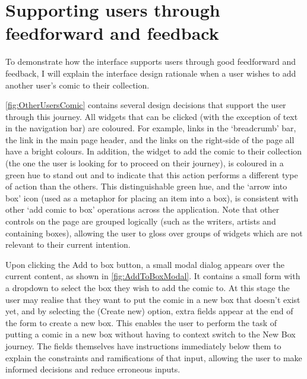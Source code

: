 \documentclass[fontsize=12pt,a4paper]{scrreprt}
\begin{document}

\newpage
\section{Supporting users through feedforward and feedback}


To demonstrate how the interface supports users through good feedforward and feedback, I will explain the interface design rationale when a user wishes to add another user's comic to their collection.

\autoref{fig:OtherUsersComic} contains several design decisions that support the user through this journey. All widgets that can be clicked (with the exception of text in the navigation bar) are coloured. For example, links in the `breadcrumb' bar, the link in the main page header, and the links on the right-side of the page all have a bright colours. In addition, the widget to add the comic to their collection (the one the user is looking for to proceed on their journey), is coloured in a green hue to stand out and to indicate that this action performs a different type of action than the others. This distinguishable green hue, and the `arrow into box' icon (used as a metaphor for placing an item into a box), is consistent with other `add comic to box' operations across the application. Note that other controls on the page are grouped logically (such as the writers, artists and containing boxes), allowing the user to gloss over groups of widgets which are not relevant to their current intention.

Upon clicking the \textsf{Add to box} button, a small modal dialog appears over the current content, as shown in \autoref{fig:AddToBoxModal}. It contains a small form with a dropdown to select the box they wish to add the comic to. At this stage the user may realise that they want to put the comic in a new box that doesn't exist yet, and by selecting the \textsf{(Create new)} option, extra fields appear at the end of the form to create a new box. This enables the user to perform the task of putting a comic in a new box without having to context switch to the \textsf{New Box} journey. The fields themselves have instructions immediately below them to explain the constraints and ramifications of that input, allowing the user to make informed decisions and reduce erroneous inputs.
\end{document}
